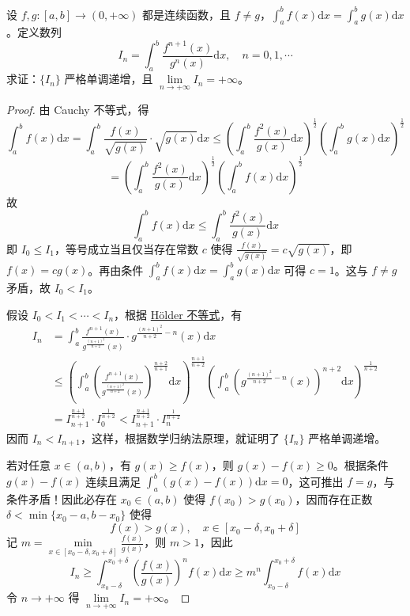 \documentclass[../../main.tex]{subfiles}%
\begin{document}
\begin{example}
设 \( f,g:[a,b]\to(0,+\infty) \) 都是连续函数，且 \( f\neq g \)，\( \int_{a}^{b}f(x)\mathrm{d}x = \int_{a}^{b}g(x)\mathrm{d}x \)。定义数列
\[
I_{n}=\int_{a}^{b}\frac{f^{n + 1}(x)}{g^{n}(x)}\mathrm{d}x,\quad n = 0,1,\cdots
\]
求证：\(\{I_{n}\}\) 严格单调递增，且 \(\lim\limits_{n\to+\infty}I_{n}=+\infty\)。
\end{example}
\begin{proof}

由 Cauchy 不等式，得
\[
\int_{a}^{b}f(x)\mathrm{d}x=\int_{a}^{b}\frac{f(x)}{\sqrt{g(x)}}\cdot\sqrt{g(x)}\mathrm{d}x\leqslant\left(\int_{a}^{b}\frac{f^{2}(x)}{g(x)}\mathrm{d}x\right)^{\frac{1}{2}}\left(\int_{a}^{b}g(x)\mathrm{d}x\right)^{\frac{1}{2}}
\]
\[
=\left(\int_{a}^{b}\frac{f^{2}(x)}{g(x)}\mathrm{d}x\right)^{\frac{1}{2}}\left(\int_{a}^{b}f(x)\mathrm{d}x\right)^{\frac{1}{2}}
\]
故
\[
\int_{a}^{b}f(x)\mathrm{d}x\leqslant\int_{a}^{b}\frac{f^{2}(x)}{g(x)}\mathrm{d}x
\]
即 \(I_{0}\leqslant I_{1}\)，等号成立当且仅当存在常数 \(c\) 使得 \(\frac{f(x)}{\sqrt{g(x)}}=c\sqrt{g(x)}\)，即 \(f(x)=cg(x)\)。再由条件 \(\int_{a}^{b}f(x)\mathrm{d}x=\int_{a}^{b}g(x)\mathrm{d}x\) 可得 \(c = 1\)。这与 \(f\neq g\) 矛盾，故 \(I_{0}<I_{1}\)。

假设 \(I_{0}<I_{1}<\cdots<I_{n}\)，根据 \hyperref[theorem:Hölder(赫尔德)不等式(积分形式)]{Hölder 不等式}，有
\begin{align*}
I_{n}&=\int_{a}^{b}\frac{f^{n + 1}(x)}{g^{\frac{(n + 1)^{2}}{n + 2}}(x)}\cdot g^{\frac{(n + 1)^{2}}{n + 2}-n}(x)\mathrm{d}x
\\
&\leqslant\left(\int_{a}^{b}\left(\frac{f^{n + 1}(x)}{g^{\frac{(n + 1)^{2}}{n + 2}}(x)}\right)^{\frac{n + 2}{n + 1}}\mathrm{d}x\right)^{\frac{n + 1}{n + 2}}\left(\int_{a}^{b}\left(g^{\frac{(n + 1)^{2}}{n + 2}-n}(x)\right)^{n + 2}\mathrm{d}x\right)^{\frac{1}{n + 2}}
\\
&=I_{n + 1}^{\frac{n + 1}{n + 2}}\cdot I_{0}^{\frac{1}{n + 2}}<I_{n + 1}^{\frac{n + 1}{n + 2}}\cdot I_{n}^{\frac{1}{n + 2}}
\end{align*}
因而 \(I_{n}<I_{n + 1}\)，这样，根据数学归纳法原理，就证明了 \(\{I_{n}\}\) 严格单调递增。

若对任意 \(x\in(a,b)\)，有 \(g(x)\geqslant f(x)\)，则 \(g(x)-f(x)\geqslant0\)。根据条件 \(g(x)-f(x)\) 连续且满足 \(\int_{a}^{b}(g(x)-f(x))\mathrm{d}x = 0\)，这可推出 \(f = g\)，与条件矛盾！因此必存在 \(x_{0}\in(a,b)\) 使得 \(f(x_{0})>g(x_{0})\)，因而存在正数 \(\delta<\min\{x_{0}-a,b - x_{0}\}\) 使得
\[
f(x)>g(x),\quad x\in[x_{0}-\delta,x_{0}+\delta]
\]
记 \(m=\min\limits_{x\in[x_{0}-\delta,x_{0}+\delta]}\frac{f(x)}{g(x)}\)，则 \(m>1\)，因此
\[
I_{n}\geqslant\int_{x_{0}-\delta}^{x_{0}+\delta}\left(\frac{f(x)}{g(x)}\right)^{n}f(x)\mathrm{d}x\geqslant m^{n}\int_{x_{0}-\delta}^{x_{0}+\delta}f(x)\mathrm{d}x
\]
令 \(n\to+\infty\) 得 \(\lim\limits_{n\to+\infty}I_{n}=+\infty\)。

\end{proof}
\end{document}
